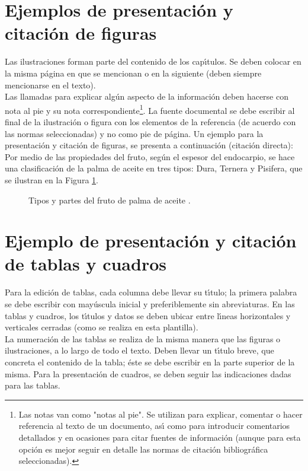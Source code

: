 \section{Ejemplos de presentaci\'{o}n y citaci\'{o}n de figuras}
Las ilustraciones forman parte del contenido de los cap\'{\i}tulos. Se deben colocar en la misma p\'{a}gina en que se mencionan o en la siguiente (deben siempre mencionarse en el texto).\\

Las llamadas para explicar alg\'{u}n aspecto de la informaci\'{o}n deben hacerse con nota al pie y su nota correspondiente\footnote{Las notas van como "notas al pie". Se utilizan para explicar, comentar o hacer referencia al texto de un documento, as\'{\i} como para introducir comentarios detallados y en ocasiones para citar fuentes de informaci\'{o}n (aunque para esta opci\'{o}n es mejor seguir en detalle las normas de citaci\'{o}n bibliogr\'{a}fica seleccionadas).}. La fuente documental se debe escribir al final de la ilustraci\'{o}n o figura con los elementos de la referencia (de acuerdo con las normas seleccionadas) y no como pie de p\'{a}gina. Un ejemplo para la presentaci\'{o}n y citaci\'{o}n de figuras, se presenta a continuaci\'{o}n (citaci\'{o}n directa):\\

Por medio de las propiedades del fruto, seg\'{u}n el espesor del endocarpio, se hace una clasificaci\'{o}n de la palma de aceite en tres tipos: Dura, Ternera y Pisifera, que se ilustran en la Figura
\ref{fig:Fruto}.\\
\begin{figure}[h]
\centering%
%
\caption{Tipos y partes del fruto de palma de aceite \cite{AG03p,AG04p}.} \label{fig:Fruto}
\end{figure}

\section{Ejemplo de presentaci\'{o}n y citaci\'{o}n de tablas y cuadros}
Para la edici\'{o}n de tablas, cada columna debe llevar su t\'{\i}tulo; la primera palabra se debe escribir con may\'{u}scula inicial y preferiblemente sin abreviaturas. En las tablas y cuadros, los t\'{\i}tulos y datos se deben ubicar entre l\'{\i}neas horizontales y verticales cerradas (como se realiza en esta plantilla).\\

La numeraci\'{o}n de las tablas se realiza de la misma manera que las figuras o ilustraciones, a lo largo de todo el texto. Deben llevar un t\'{\i}tulo breve, que concreta el contenido de la tabla; \'{e}ste se debe escribir en la parte superior de la misma. Para la presentaci\'{o}n de cuadros, se deben seguir las indicaciones dadas para las tablas.\\

